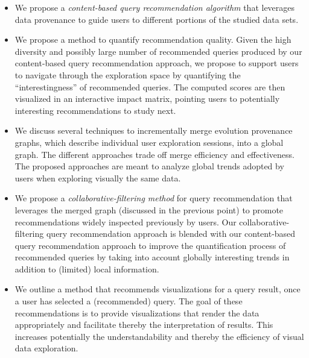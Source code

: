\begin{itemize}

\item We propose a \emph{content-based query recommendation algorithm} that leverages data provenance to guide users to different portions of the studied data sets. 



\item  We propose a method to quantify recommendation quality.  Given the high diversity and possibly large number of recommended queries 
produced by our content-based query recommendation approach, we propose to support users to navigate through the exploration space by quantifying the ``interestingness'' of recommended queries. The computed scores are then visualized in an interactive impact matrix, pointing users to potentially interesting recommendations to study next.


\item We discuss several techniques to incrementally merge evolution provenance graphs, which
 describe individual user exploration sessions, into a global graph. The different approaches trade off merge efficiency and effectiveness. The proposed approaches are meant to analyze global trends adopted by users when exploring visually the same data.
 

\item We propose a \emph{collaborative-filtering method} for query recommendation that leverages the merged graph (discussed in the previous point) to promote recommendations widely inspected previously by users. 
Our collaborative-filtering query recommendation approach is blended with our content-based query recommendation approach to improve the quantification process of recommended queries by taking into account globally interesting trends in addition to (limited) local information.

\item 
We outline a method that recommends visualizations for a query result, once a user has selected a (recommended) query. The goal of these recommendations is to provide visualizations that render the data appropriately and facilitate thereby the interpretation of results.  This increases potentially the understandability and thereby the efficiency of visual data exploration.


\end{itemize}



